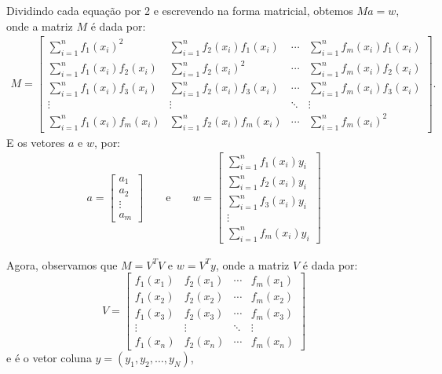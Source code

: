 Dividindo cada equação por 2 e escrevendo na forma matricial, obtemos $Ma=w$, onde a matriz $M$ é dada por:
\begin{eqnarray*}
M = \begin{bmatrix}
\sum\limits_{i=1}^n f_1(x_i)^2 & \sum\limits_{i=1}^n f_2(x_i) f_1(x_i) & \!\cdots\! & \sum\limits_{i=1}^n f_m(x_i) f_1(x_i)\\
\sum\limits_{i=1}^n f_1(x_i) f_2(x_i)&\sum\limits_{i=1}^n f_2(x_i)^2 & \!\cdots\! & \sum\limits_{i=1}^n f_m(x_i)  f_2(x_i)\\
\sum\limits_{i=1}^n f_1(x_i) f_3(x_i)&\sum\limits_{i=1}^n f_2(x_i)f_3(x_i) & \!\cdots\! & \sum\limits_{i=1}^n f_m(x_i)  f_3(x_i)\\
\vdots & \vdots & \ddots & \vdots\\
\sum\limits_{i=1}^n f_1(x_i) f_m(x_i)&\sum\limits_{i=1}^n f_2(x_i)f_m(x_i) & \!\cdots\! & \sum\limits_{i=1}^n f_m(x_i)  ^2
\end{bmatrix}.
\end{eqnarray*}
E os vetores $a$ e $w$, por:
\begin{eqnarray*}
a=\left[
\begin{array}{c}
a_1\\
a_2\\
\vdots\\
a_m
\end{array}
\right]\qquad\text{e}\qquad w=\left[\begin{array}{c}
\sum\limits_{i=1}^n f_1(x_i) y_i\\
\sum\limits_{i=1}^n f_2(x_i) y_i\\
\sum\limits_{i=1}^n f_3(x_i) y_i\\
\vdots\\
\sum\limits_{i=1}^n f_m(x_i) y_i
\end{array}
\right]
\end{eqnarray*}

Agora, observamos que $M=V^TV$ e $w=V^T y$, onde a matriz $V$ é dada por:
\begin{equation*}
  V=\begin{bmatrix}
    f_1(x_1)&f_2(x_1) & \cdots & f_m(x_1)\\
    f_1(x_2)&f_2(x_2) & \cdots & f_m(x_2)\\
    f_1(x_3)&f_2(x_3) & \cdots & f_m(x_3)\\
    \vdots & \vdots & \ddots & \vdots\\
    f_1(x_n)&f_2(x_n) & \cdots & f_m(x_n)
  \end{bmatrix}
\end{equation*}
e é o vetor coluna $y = (y_1, y_2, \dotsc, y_N)$,

